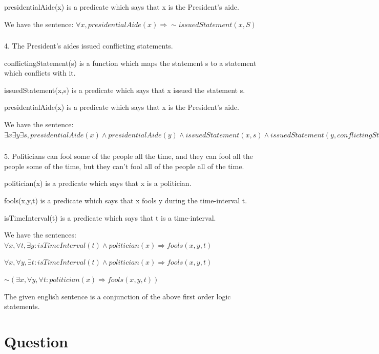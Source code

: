 \documentclass[a4paper,10pt]{article}
\begin{document}
presidentialAide(x) is a predicate which says that x is the President's aide.

We have the sentence:
$\forall x, presidentialAide(x) \Rightarrow \sim issuedStatement(x,S)$

\subsubsection{}
4. The President's aides issued conflicting statements.

conflictingStatement(s) is a function which maps the statement s to a statement which conflicts with it.

issuedStatement(x,s) is a predicate which says that x issued the statement s.

presidentialAide(x) is a predicate which says that x is the President's aide.

We have the sentence:
$\exists x \exists y \exists s, presidentialAide(x) \wedge presidentialAide(y) \wedge issuedStatement(x,s) \wedge issuedStatement(y,conflictingStatement(s))$


\subsubsection{}
5. Politicians can fool some of the people all the time, and they can fool all the people some of the time, but they can't fool all of the people all of the time. 

politician(x) is a predicate which says that x is a politician.

fools(x,y,t) is a predicate which says that x fools y during the time-interval t.

isTimeInterval(t) is a predicate which says that t is a time-interval.

We have the sentences:
$\forall x, \forall t, \exists y: isTimeInterval(t) \wedge politician(x) \Rightarrow fools(x,y,t)$

$\forall x, \forall y, \exists t: isTimeInterval(t) \wedge politician(x) \Rightarrow fools(x,y,t)$

$\sim ( \exists x, \forall y, \forall t:  politician(x) \Rightarrow fools(x,y,t))$

The given english sentence is a conjunction of the above first order logic statements.


\section{Question}
\end{document}

